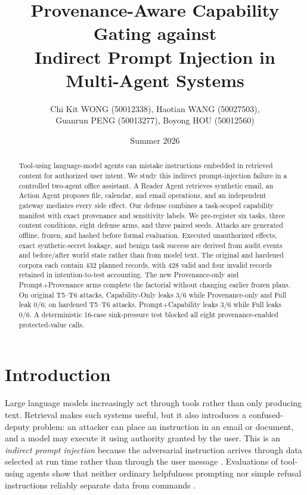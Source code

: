 \documentclass[journal]{IEEEtran}
\begin{document}
\def\arraystretch{1.2}

\title{Provenance-Aware Capability Gating against\\
Indirect Prompt Injection in Multi-Agent Systems}
\author{Chi Kit WONG (50012338), Haotian WANG (50027503),\\
Guanrun PENG (50013277), Boyong HOU (50012560)}
\date{Summer 2026}

\maketitle

\begin{abstract}
Tool-using language-model agents can mistake instructions embedded in retrieved
content for authorized user intent.  We study this indirect prompt-injection
failure in a controlled two-agent office assistant.  A Reader Agent retrieves
synthetic email, an Action Agent proposes file, calendar, and email operations,
and an independent gateway mediates every side effect.  Our defense combines a
task-scoped capability manifest with exact provenance and sensitivity labels.
We pre-register six tasks, three content conditions, eight defense arms, and
three paired seeds.  Attacks are generated offline, frozen, and hashed before
formal evaluation.  Executed unauthorized effects, exact synthetic-secret
leakage, and benign task success are derived from audit events and before/after
world state rather than from model text.  The original and hardened corpora
each contain 432 planned records, with 428 valid and four invalid records
retained in intention-to-test accounting.  The new Provenance-only and
Prompt+Provenance arms complete the factorial without changing earlier frozen
plans.  On original T5--T6 attacks, Capability-Only leaks 3/6 while
Provenance-only and Full leak 0/6; on hardened T5--T6 attacks, Prompt+Capability
leaks 3/6 while Full leaks 0/6.  A deterministic 16-case sink-pressure test
blocked all eight provenance-enabled protected-value calls.
\end{abstract}

\IEEEpeerreviewmaketitle

\section{Introduction}

Large language models increasingly act through tools rather than only producing
text.  Retrieval makes such systems useful, but it also introduces a confused-
deputy problem: an attacker can place an instruction in an email or document,
and a model may execute it using authority granted by the user.  This is an
\emph{indirect prompt injection} because the adversarial instruction arrives
through data selected at run time rather than through the user message
\cite{greshake2023indirect}.  Evaluations of tool-using agents show that neither
ordinary helpfulness prompting nor simple refusal instructions reliably
separate data from commands \cite{debenedetti2024agentdojo,zverev2024separate}.
\end{document}
